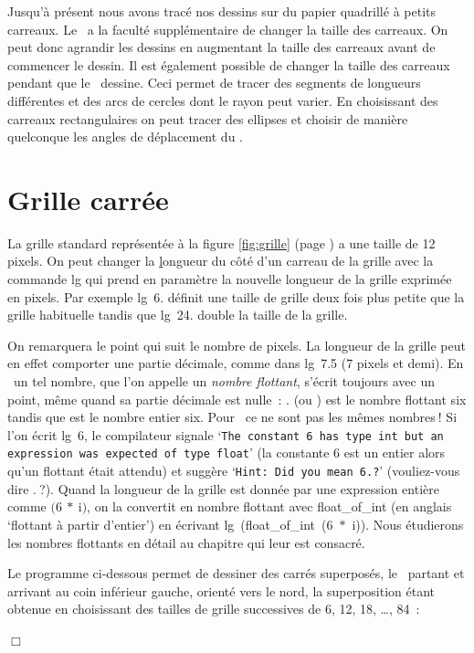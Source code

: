 Jusqu'à présent nous avons tracé nos dessins sur du papier quadrillé à petits carreaux.
Le \robot\ a la faculté supplémentaire de changer la taille des carreaux. 
On peut donc agrandir les dessins en augmentant la taille des carreaux avant de commencer le dessin. Il est également possible 
de changer la taille des carreaux pendant que le \robot\ dessine. Ceci permet de
tracer des segments de longueurs différentes et des arcs de cercles dont le rayon peut varier. 
En choisissant des carreaux rectangulaires on peut tracer des ellipses et choisir
de manière quelconque les angles de déplacement du \robot.

\section{Grille carrée}
La grille standard représentée à la figure \ref{fig:grille} (page \pageref{fig:grille})
a une taille de 12 pixels. On peut changer la 
\underline{l}ongueur du côté d'un carreau de la \underline{g}rille avec la commande {\idt lg} qui
prend en paramètre la nouvelle longueur de la grille exprimée en pixels. Par exemple
{\idt lg\ 6.} définit une taille de grille deux fois plus petite que la grille habituelle tandis que 
{\idt lg\ 24.} double la taille de la grille.

On remarquera le point qui suit le nombre de pixels. La longueur de la grille peut en effet
comporter une partie décimale, comme dans {\idt lg\ 7.5} (7 pixels et demi). En \ocaml\ un tel
nombre, que l'on appelle un {\em nombre flottant}, s'écrit toujours avec un point,
même quand sa partie décimale est nulle~: {.} (ou {}) est le nombre flottant six
tandis que {} est le nombre entier six. Pour \ocaml\ ce ne sont pas les mêmes nombres$\:$!
Si l'on écrit {\idt lg\ 6}, le compilateur signale
`{\tt The constant 6 has type int but an expression was expected of type float}'
(la constante 6 est un entier alors qu'un flottant était attendu) et suggère 
`{\tt Hint: Did you mean 6.?}' (vouliez-vous dire {.}$\:$?).
Quand la longueur de la grille est donnée par une expression entière comme 
$(6\ \ast\ ${\idt i}$)$, on la convertit en nombre flottant avec {\idt float\_of\_int} (en anglais
`flottant à partir d'entier') en écrivant {\idt lg\ (float\_of\_int\ (6\ $\ast$\ i))}. Nous étudierons
les nombres flottants en détail au chapitre qui leur est consacré.

\begin{exemple}{\rm
 Le programme ci-dessous permet de des\-si\-ner des carrés superposés, le \robot\ partant
 et arrivant au coin inférieur gauche, orienté vers le nord, la superposition étant
 obtenue en choisissant des tailles de grille successives de 6, 12, 18, \ldots, 84~:
 
 
\noindent $\Box$ }\end{exemple}


